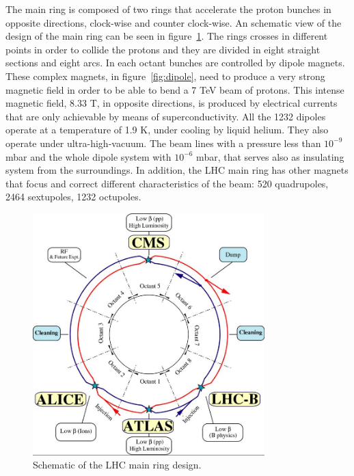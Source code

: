 The main ring is composed of two rings that accelerate the proton bunches in opposite directions, clock-wise and counter clock-wise. An schematic view of the design of the main ring can be seen in figure~\ref{fig:schematic}. The rings crosses in different points in order to collide the protons and they are divided in eight straight sections and eight arcs. In each octant bunches are controlled by dipole magnets. These complex magnets, in figure~\ref{fig:dipole}, need to produce a very strong magnetic field in order to be able to bend a 7 TeV beam of protons. This intense magnetic field, 8.33 T, in opposite directions, is produced by electrical currents that are only achievable by means of superconductivity. All the 1232 dipoles operate at a temperature of 1.9 K, under cooling by liquid helium. They also operate under ultra-high-vacuum. The beam lines with a pressure less than $10^{-9}$ mbar and the whole dipole system with $10^{-6}$ mbar, that serves also as insulating system from the surroundings. In addition, the LHC main ring has other magnets that focus and correct different characteristics of the beam: 520 quadrupoles, 2464 sextupoles, 1232 octupoles. 

\begin{figure}[!Hhtbp]
  \begin{center}
    \includegraphics[width=0.8\textwidth]{figs/lhc-schematic.jpg}
    \caption{Schematic of the LHC main ring design.}
    \label{fig:schematic}
  \end{center}
\end{figure}

